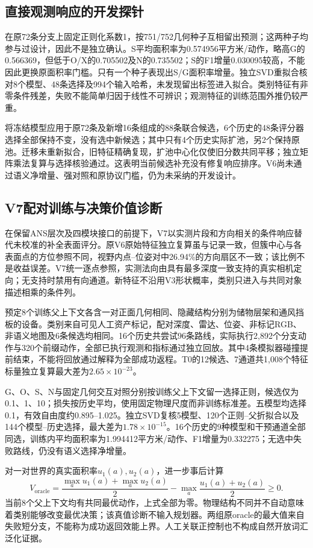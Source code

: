 \documentclass[11pt,a4paper]{article}
\begin{document}
\subsection{直接观测响应的开发探针}
在原72条分支上固定正则化系数1，按751/752几何种子互相留出预测；这两种子均参与过设计，因此不是独立确认。S平均面积率为0.574956平方米/动作，略高G的0.566369，但低于O/X的0.705502及N的0.735502；S的F1增量0.030095较高，不能因此更换原面积率门槛。只有一个种子表现出S/G面积率增量。独立SVD重拟合核对8个模型、48条选择及994个输入哈希，未发现留出标签进入拟合。类别特征有非零条件残差，失败不能简单归因于线性不可辨识；观测特征的训练范围外推仍较严重。

将冻结模型应用于原72条及新增16条组成的88条联合候选，6个历史的48条评分器选择全部保持不变，没有选中新候选；其中只有4个历史实际扩池，另2个保持原池。迁移未重新拟合，旧特征精确复现，扩池中心化仅使旧分数共同平移；独立矩阵乘法复算与选择核验通过。这表明当前候选补充没有修复响应排序。V6尚未通过语义净增量、强对照和原协议门槛，仍为未采纳的开发设计。

\subsection{V7配对训练与决策价值诊断}
在保留ANS层次及四模块接口的前提下，V7以实测片段和方向相关的条件响应替代未校准的补全表面评分。原V6原始特征独立复算虽与记录一致，但簇中心与各表面点的方位参照不同，视野内点--位姿对中26.94\%的方向扇区不一致；该比例不是收益误差。V7统一逐点参照，实测法向由具有最多深度一致支持的真实相机定向；无支持时禁用有向通道。新特征不沿用V3形状概率，类别只进入与共同对象描述相乘的条件列。

预定8个训练父上下文各含一对正面几何相同、隐藏结构分别为储物层架和通风挡板的设备。类别来自可见人工资产标记，配对深度、雷达、位姿、非标记RGB、非语义地图及6条候选均相同。16个历史共尝试96条路线，实际执行2,892个分支动作与320个前缀动作，全部已执行观测和指标通过独立回放。其中4条模拟器碰撞提前结束，不能将回放通过解释为全部成功返程。T0的12候选、7通道共1,008个特征标量独立复算最大差为$2.65\times10^{-23}$。

G、O、S、N与固定几何交互对照分别按训练父上下文留一选择正则，候选仅为0.1、1、10；损失按历史平均，使用固定物理尺度而非训练标准差。五模型均选择0.1，有效自由度约0.895--1.025。独立SVD复核5模型、120个正则--父折拟合以及144个模型--历史选择，最大差为$1.78\times10^{-15}$。16个历史的9种模型和干预通道全部同选，训练内平均面积率为1.994412平方米/动作、F1增量为0.332275；无选中失败路线，仍没有语义选择净增量。

对一对世界的真实面积率$u_1(a),u_2(a)$，进一步事后计算
\begin{equation}
V_{\mathrm{oracle}}=\frac{\max_a u_1(a)+\max_a u_2(a)}{2}
-\max_a\frac{u_1(a)+u_2(a)}{2}\ge0.
\end{equation}
当前8个父上下文均有共同最优动作，上式全部为零。物理结构不同并不自动意味着类别能够改变最优决策；该真值诊断不输入规划器。两组原oracle的最大值来自失败短分支，不能称为成功返回效能上界。人工关联正控制也不构成自然开放词汇泛化证据。
\end{document}
